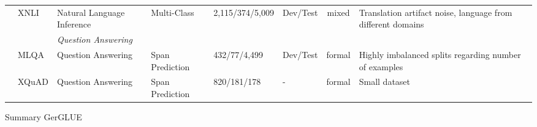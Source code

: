 \begin{landscape}
{\begin{tabularx}{\linewidth}{ll|lllllX}
                                                             & XNLI               & Natural Language Inference  & Multi-Class                 & 2,115/374/5,009                                       & Dev/Test                            & \multicolumn{1}{c}{mixed}                                    & Translation artifact noise, language from different domains  \\ \cline{3-8}
                                                             &                    & \multicolumn{6}{g}{\textit{Question Answering}}\\
                                                             & MLQA               & Question Answering          & Span Prediction             & 432/77/4,499                                          & Dev/Test                            & \multicolumn{1}{c}{formal}                                   & Highly imbalanced splits regarding number of examples        \\
                                                             & XQuAD              & Question Answering          & Span Prediction             & 820/181/178                                           & -                                   & \multicolumn{1}{c}{formal}                                   & Small dataset
\end{tabularx}
}{Summary GerGLUE}

\end{landscape}

